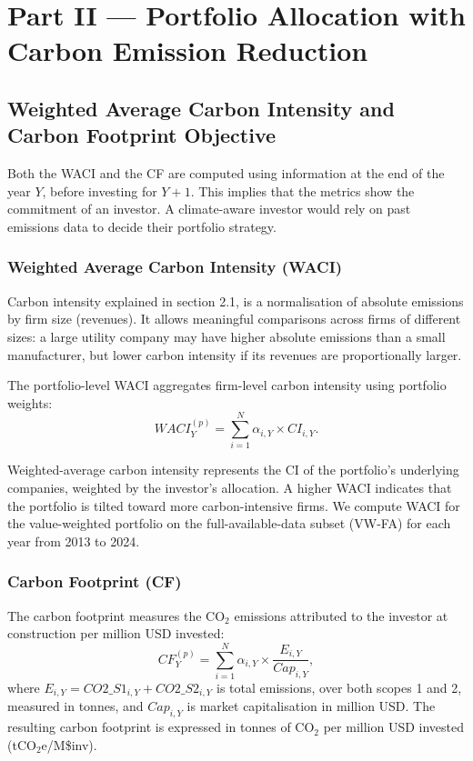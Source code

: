 \documentclass[11pt,a4paper]{article}
\begin{document}
\section{Part II --- Portfolio Allocation with Carbon Emission Reduction}
\label{sec:part2}

\subsection{Weighted Average Carbon Intensity and Carbon Footprint Objective}

Both the WACI and the CF are computed using information at the end of the year \(Y\), before investing for \(Y+1\). This implies that the metrics show the commitment of an investor. A climate-aware investor would rely on past emissions data to decide their portfolio strategy.

\subsubsection{Weighted Average Carbon Intensity (WACI)}

Carbon intensity explained in section 2.1, is a normalisation of absolute emissions by firm size (revenues). It allows meaningful comparisons across firms of different sizes: a large utility company may have higher absolute emissions than a small manufacturer, but lower carbon intensity if its revenues are proportionally larger.

The portfolio-level WACI aggregates firm-level carbon intensity using portfolio weights:
\begin{equation}
WACI_Y^{(p)} = \sum_{i=1}^{N} \alpha_{i,Y} \times CI_{i,Y}.
\end{equation}

Weighted-average carbon intensity represents the CI of the portfolio's underlying companies, weighted by the investor's allocation. A higher WACI indicates that the portfolio is tilted toward more carbon-intensive firms. We compute WACI for the value-weighted portfolio on the full-available-data subset (VW-FA) for each year from 2013 to 2024.

\subsubsection{Carbon Footprint (CF)}

The carbon footprint measures the CO\(_2\) emissions attributed to the investor at construction per million USD invested:
\begin{equation}
CF_Y^{(p)} = \sum_{i=1}^{N} \alpha_{i,Y} \times \frac{E_{i,Y}}{Cap_{i,Y}},
\end{equation}
where \(E_{i,Y} = CO2\_S1_{i,Y} + CO2\_S2_{i,Y}\) is total emissions, over both scopes 1 and 2, measured in tonnes, and \(Cap_{i,Y}\) is market capitalisation in million USD. The resulting carbon footprint is expressed in tonnes of CO\(_2\) per million USD invested (tCO\(_2\)e/M\$inv).
\end{document}
